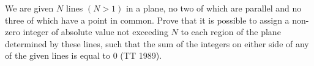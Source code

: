 We are given $N$ lines $(N > 1)$ in a plane, no two of which are parallel and no three of which have a point in common. Prove that it is possible to assign a non-zero integer of absolute value not exceeding $N$ to each region of the plane determined by these lines, such that the sum of the integers on either side of any of the given lines is equal to $0$ (TT 1989).
